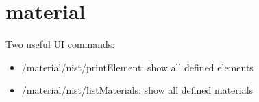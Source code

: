 \section{material}
Two useful UI commands:
\begin{itemize}
    \item /material/nist/printElement:	show all defined elements
    \item /material/nist/listMaterials:	show all defined materials
\end{itemize}
